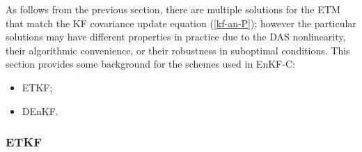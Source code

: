 \documentclass[11pt]{report}
\begin{document}
As follows from the previous section, there are multiple solutions for the ETM that match the KF covariance update equation (\ref{kf-an-P}); however the particular solutions may have different properties in practice due to the DAS nonlinearity, their algorithmic convenience, or their robustness in suboptimal conditions.
This section provides some background for the schemes used in EnKF-C:
\begin{itemize}
\item ETKF;
\item DEnKF.
\end{itemize}

\subsubsection{ETKF}
\end{document}
